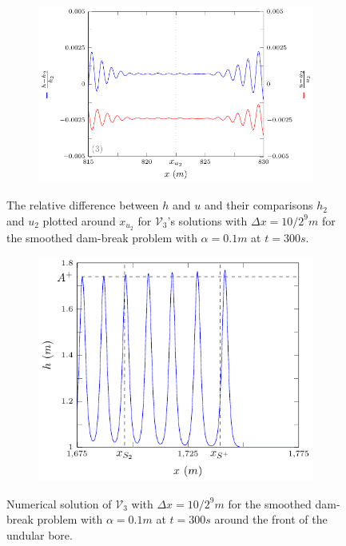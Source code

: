 \documentclass[times]{elsarticle}
\begin{document}
\begin{figure}
	\centering
	\begin{subfigure}{0.6\textwidth}
		\includegraphics[width=\textwidth]{pics/results/SDB/numsols/SWWCOMP/300s/2.pdf}
	\end{subfigure}%
	\caption{The relative difference between $h$ and $u$ and their comparisons $h_2$ and $u_2$ plotted around $x_{u_2}$ for $\mathcal{V}_3$'s solutions with $\Delta x = 10/2^{9}m$ for the smoothed dam-break problem with $\alpha = 0.1m$ at $t=300s$.}
	\label{fig:uhSWWcomp}
\end{figure}

\begin{figure}
	\centering
	\begin{subfigure}{0.6\textwidth}
		\includegraphics[width=\textwidth]{pics/results/SDB/numsols/300s/hfront.pdf}
	\end{subfigure}%
	\caption{Numerical solution of $\mathcal{V}_3$ with $\Delta x = 10/2^{9}m$ for the smoothed dam-break problem with $\alpha = 0.1m$ at $t=300s$ around the front of the undular bore.}
	\label{fig:frontcomp}
\end{figure}
\end{document}
